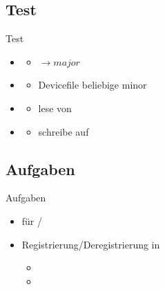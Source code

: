 \subsection{Test}
\begin{frame}{Test}
 \begin{itemize}
  \item {}
  \begin{itemize}
   \item $\to major$
  \end{itemize}
  \item {}
  \begin{itemize}
   \item Devicefile beliebige minor
  \end{itemize}
  \item {}
  \begin{itemize}
   \item lese von 
  \end{itemize}
  \item {}
  \begin{itemize}
   \item schreibe auf 
  \end{itemize}
 \end{itemize}
\end{frame}

\subsection{Aufgaben}
\begin{frame}{Aufgaben}
\begin{itemize}
 \item {} für \host/\targetS
 \item Registrierung/Deregistrierung  in 
 \begin{itemize}
  \item  {}
  \item  {}
 \end{itemize}
\end{itemize}
\end{frame}


